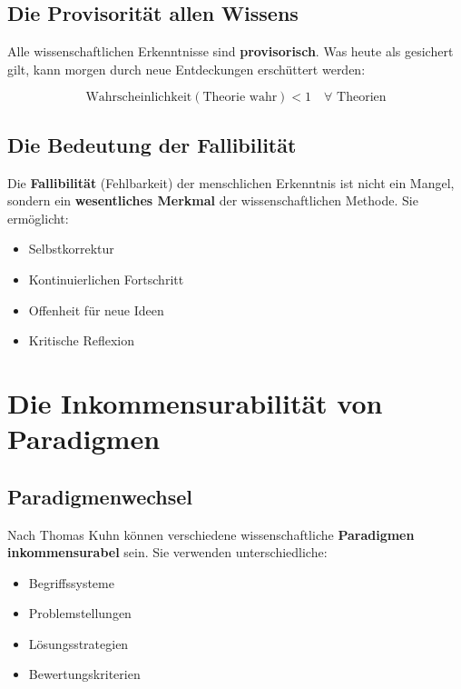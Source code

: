 \documentclass[12pt,a4paper]{report}
\begin{document}
	\subsection{Die Provisorität allen Wissens}
	
	Alle wissenschaftlichen Erkenntnisse sind \textbf{provisorisch}. Was heute als gesichert gilt, kann morgen durch neue Entdeckungen erschüttert werden:
	
	\begin{equation}
		\text{Wahrscheinlichkeit}(\text{Theorie wahr}) < 1 \quad \forall \text{ Theorien}
	\end{equation}
	
	\subsection{Die Bedeutung der Fallibilität}
	
	Die \textbf{Fallibilität} (Fehlbarkeit) der menschlichen Erkenntnis ist nicht ein Mangel, sondern ein \textbf{wesentliches Merkmal} der wissenschaftlichen Methode. Sie ermöglicht:
	
	\begin{itemize}
		\item Selbstkorrektur
		\item Kontinuierlichen Fortschritt
		\item Offenheit für neue Ideen
		\item Kritische Reflexion
	\end{itemize}
	
	\section{Die Inkommensurabilität von Paradigmen}
	
	\subsection{Paradigmenwechsel}
	
	Nach Thomas Kuhn können verschiedene wissenschaftliche \textbf{Paradigmen inkommensurabel} sein. Sie verwenden unterschiedliche:
	
	\begin{itemize}
		\item Begriffssysteme
		\item Problemstellungen
		\item Lösungsstrategien
		\item Bewertungskriterien
	\end{itemize}
	
\end{document}
